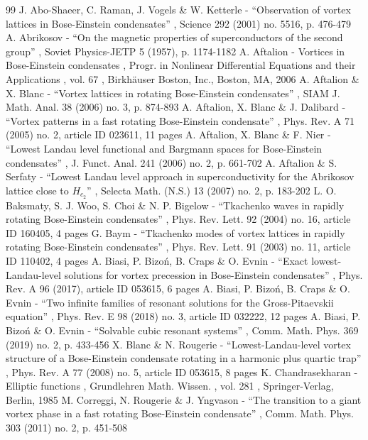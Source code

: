 \begin{thebibliography}{99}
 J. Abo-Shaeer, C. Raman, J. Vogels \& W. Ketterle - “Observation of vortex lattices in Bose-Einstein condensates” , Science 292 (2001) no. 5516, p. 476-479
 A. Abrikosov - “On the magnetic properties of superconductors of the second group” , Soviet Physics-JETP 5 (1957), p. 1174-1182
 A. Aftalion - Vortices in Bose-Einstein condensates , Progr. in Nonlinear Differential Equations and their Applications , vol. 67 , Birkhäuser Boston, Inc., Boston, MA, 2006
 A. Aftalion \& X. Blanc - “Vortex lattices in rotating Bose-Einstein condensates” , SIAM J. Math. Anal. 38 (2006) no. 3, p. 874-893
 A. Aftalion, X. Blanc \& J. Dalibard - “Vortex patterns in a fast rotating Bose-Einstein condensate” , Phys. Rev. A 71 (2005) no. 2, article ID 023611, 11 pages
 A. Aftalion, X. Blanc \& F. Nier - “Lowest Landau level functional and Bargmann spaces for Bose-Einstein condensates” , J. Funct. Anal. 241 (2006) no. 2, p. 661-702
 A. Aftalion \& S. Serfaty - “Lowest Landau level approach in superconductivity for the Abrikosov lattice close to $H_{c_2}$” , Selecta Math. (N.S.) 13 (2007) no. 2, p. 183-202
 L. O. Baksmaty, S. J. Woo, S. Choi \& N. P. Bigelow - “Tkachenko waves in rapidly rotating Bose-Einstein condensates” , Phys. Rev. Lett. 92 (2004) no. 16, article ID 160405, 4 pages
 G. Baym - “Tkachenko modes of vortex lattices in rapidly rotating Bose-Einstein condensates” , Phys. Rev. Lett. 91 (2003) no. 11, article ID 110402, 4 pages
 A. Biasi, P. Bizoń, B. Craps \& O. Evnin - “Exact lowest-Landau-level solutions for vortex precession in Bose-Einstein condensates” , Phys. Rev. A 96 (2017), article ID 053615, 6 pages
 A. Biasi, P. Bizoń, B. Craps \& O. Evnin - “Two infinite families of resonant solutions for the Gross-Pitaevskii equation” , Phys. Rev. E 98 (2018) no. 3, article ID 032222, 12 pages
 A. Biasi, P. Bizoń \& O. Evnin - “Solvable cubic resonant systems” , Comm. Math. Phys. 369 (2019) no. 2, p. 433-456
 X. Blanc \& N. Rougerie - “Lowest-Landau-level vortex structure of a Bose-Einstein condensate rotating in a harmonic plus quartic trap” , Phys. Rev. A 77 (2008) no. 5, article ID 053615, 8 pages
 K. Chandrasekharan - Elliptic functions , Grundlehren Math. Wissen. , vol. 281 , Springer-Verlag, Berlin, 1985
 M. Correggi, N. Rougerie \& J. Yngvason - “The transition to a giant vortex phase in a fast rotating Bose-Einstein condensate” , Comm. Math. Phys. 303 (2011) no. 2, p. 451-508

\end{thebibliography}

